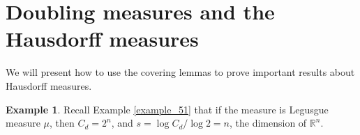 \documentclass[11pt]{book}
\theoremstyle{definition}
\newtheorem{example}{Example}[chapter]
\numberwithin{equation}{chapter}
\begin{document}
\medskip





\section{Doubling measures and the Hausdorff measures}

We will present how to use the covering lemmas to prove important results about Hausdorff measures.

\medskip

\begin{example}
Recall Example \ref{example_51} that if the measure is Legusgue measure $\mu$, then $C_d = 2^n$, and $s = \log C_d/\log 2 = n$, the dimension of $\mathbb{R}^n$.
\end{example}

\medskip
\end{document}
